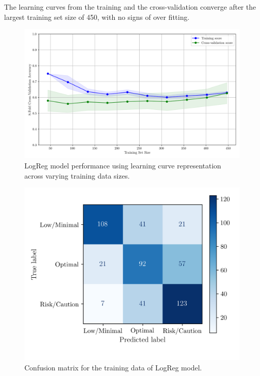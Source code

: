 \documentclass[conference]{IEEEtran}
\begin{document}
The learning curves from the training and the cross-validation converge after the largest training set size of 450, with no signs of over fitting.

\begin{figure}[H]
    \centering
    \includegraphics[width=1\linewidth]{assets/LOGR_lercurve.png}
    \caption{LogReg model performance using learning curve representation across varying training data sizes.}
    \label{lcLogReg}
\end{figure}

\begin{figure}[H]
    \centering
    \includegraphics[width=1\linewidth]{assets/LOGR_confmatTrain.png}
    \caption{Confusion matrix for the training data of LogReg model.}
    \label{lcLogReg}
\end{figure}
\end{document}
